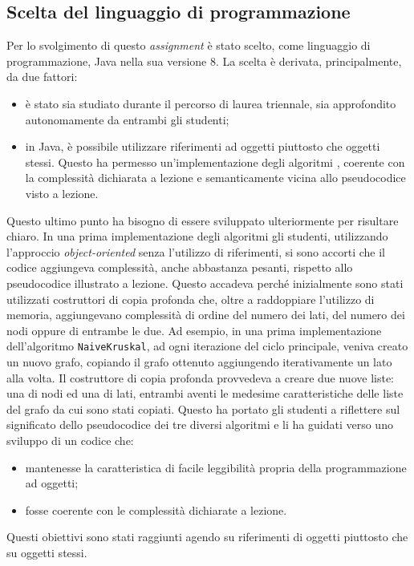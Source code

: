 \subsection{Scelta del linguaggio di programmazione}
Per lo svolgimento di questo \emph{assignment} è stato scelto, come linguaggio di programmazione, Java nella sua versione 8. La scelta è derivata, principalmente, da due fattori: 
\begin{itemize}
	\item è stato sia studiato durante il percorso di laurea triennale, sia approfondito autonomamente da entrambi gli studenti;
	\item in Java, è possibile utilizzare riferimenti ad oggetti piuttosto che oggetti stessi. Questo ha permesso un'implementazione degli algoritmi , coerente con la complessità dichiarata a lezione e semanticamente vicina allo pseudocodice visto a lezione. 
\end{itemize}
Questo ultimo punto ha bisogno di essere sviluppato ulteriormente per risultare chiaro. In una prima implementazione degli algoritmi gli studenti, utilizzando l'approccio \textit{object-oriented} senza l'utilizzo di riferimenti, si sono accorti che il codice aggiungeva complessità, anche abbastanza pesanti, rispetto allo pseudocodice illustrato a lezione. Questo accadeva perché inizialmente sono stati utilizzati costruttori di copia profonda che, oltre a raddoppiare l'utilizzo di memoria, aggiungevano complessità di ordine del numero dei lati, del numero dei nodi oppure di entrambe le due. \eqcapo
Ad esempio, in una prima implementazione dell'algoritmo \texttt{NaiveKruskal}, ad ogni iterazione del ciclo principale, veniva creato un nuovo grafo, copiando il grafo ottenuto aggiungendo iterativamente un lato alla volta. Il costruttore di copia profonda provvedeva a creare due nuove liste: una di nodi ed una di lati, entrambi aventi le medesime caratteristiche delle liste del grafo da cui sono stati copiati.\eqcapo
 Questo ha portato gli studenti a riflettere sul significato dello pseudocodice dei tre diversi algoritmi e li ha guidati verso uno sviluppo di un codice che:
 \begin{itemize}
 	\item mantenesse la caratteristica di facile leggibilità propria della programmazione ad oggetti;
	\item fosse coerente con le complessità dichiarate a lezione.
 \end{itemize}
Questi obiettivi sono stati raggiunti agendo su riferimenti di oggetti piuttosto che su oggetti stessi.

